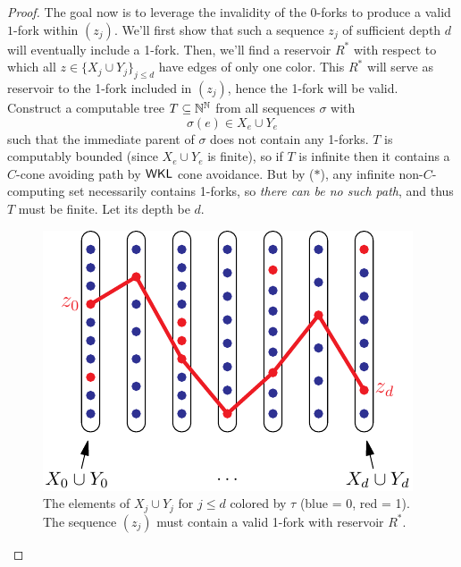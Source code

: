 \documentclass{amsart}
\begin{document}
\begin{proof}
		The goal now is to leverage the invalidity of the $0$-forks to produce a valid $1$-fork within $(z_j)$. We'll first show that such a sequence $z_j$ of sufficient depth $d$ will eventually include a 1-fork. Then, we'll find a reservoir $R^*$ with respect to which all $z\in \{X_j\cup Y_j\}_{j\leq d}$ have edges of only one color. This $R^*$ will serve as reservoir to the 1-fork included in $(z_j)$, hence the 1-fork will be valid.\\
		
		Construct a computable tree $T\subseteq \mathbb{N}^{\mathbb{N}}$ from all sequences $\sigma$ with
		$$
		\sigma(e) \in X_e\cup Y_e
		$$
		such that the immediate parent of $\sigma$ does not contain any 1-forks. $T$ is computably bounded (since $X_e\cup Y_e$ is finite), so if $T$ is infinite then it contains a $C$-cone avoiding path by $\sf{WKL}$ cone avoidance. But by ($\ast$), any infinite non-$C$-computing set necessarily contains 1-forks, so \textit{there can be no such path}, and thus $T$ must be finite. Let its depth be $d$.
		
		\begin{figure}[h]
			\includegraphics{Figures/SeetapunTree.pdf}
			\caption{The elements of $X_j\cup Y_j$ for $j\leq d$ colored by $\tau$ (blue = 0, red = 1). The sequence $(z_j)$ must contain a valid 1-fork with reservoir $R^*$.}
		\end{figure}
		

\end{proof}
\end{document}
